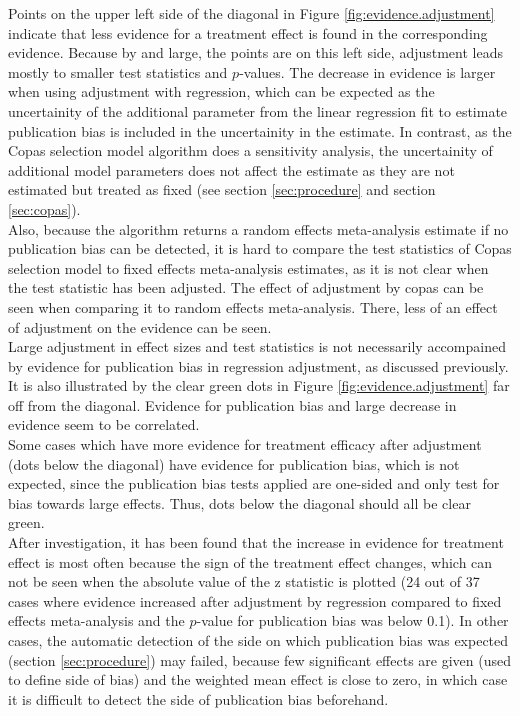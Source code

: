 \documentclass[11pt,a4paper,twoside]{book}\usepackage[]{graphicx}\usepackage[]{color}
\begin{document}
Points on the upper left side of the diagonal in Figure \ref{fig:evidence.adjustment} indicate that less evidence for a treatment effect is found in the corresponding evidence. Because by and large, the points are on this left side, adjustment leads mostly to smaller test statistics and $p$-values. The decrease in evidence is larger when using adjustment with regression, which can be expected as the uncertainity of the additional parameter from the linear regression fit to estimate publication bias is included in the uncertainity in the estimate. In contrast, as the Copas selection model algorithm does a sensitivity analysis, the uncertainity of additional model parameters does not affect the estimate as they are not estimated but treated as fixed (see section \ref{sec:procedure} and section \ref{sec:copas}). \\
Also, because the algorithm returns a random effects meta-analysis estimate if no publication bias can be detected, it is hard to compare the test statistics of Copas selection model to fixed effects meta-analysis estimates, as it is not clear when the test statistic has been adjusted. The effect of adjustment by copas can be seen when comparing it to random effects meta-analysis. There, less of an effect of adjustment on the evidence can be seen. \\
Large adjustment in effect sizes and test statistics is not necessarily accompained by evidence for publication bias in regression adjustment, as discussed previously. It is also illustrated by the clear green dots in Figure \ref{fig:evidence.adjustment} far off from the diagonal. Evidence for publication bias and large decrease in evidence seem to be correlated.\\
Some cases which have more evidence for treatment efficacy after adjustment (dots below the diagonal) have evidence for publication bias, which is not expected, since the publication bias tests applied are one-sided and only test for bias towards large effects. Thus, dots below the diagonal should all be clear green. \\
After investigation, it has been found that the increase in evidence for treatment effect is most often because the sign of the treatment effect changes, which can not be seen when the absolute value of the z statistic is plotted (24 out of 37 cases where evidence increased after adjustment by regression compared to fixed effects meta-analysis and the $p$-value for publication bias was below 0.1). In other cases, the automatic detection of the side on which publication bias was expected (section \ref{sec:procedure}) may failed, because few significant effects are given (used to define side of bias) and the weighted mean effect is close to zero, in which case it is difficult to detect the side of publication bias beforehand.\\
\end{document}
